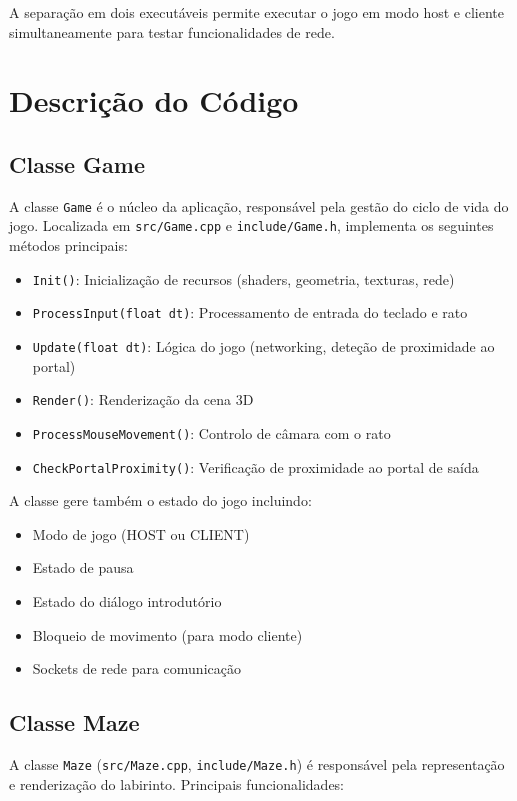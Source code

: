 A separação em dois executáveis permite executar o jogo em modo host e cliente simultaneamente para testar funcionalidades de rede.

\section{Descrição do Código} \label{sec:impl_codigo}

\subsection{Classe Game}
A classe \texttt{Game} é o núcleo da aplicação, responsável pela gestão do ciclo de vida do jogo. Localizada em \texttt{src/Game.cpp} e \texttt{include/Game.h}, implementa os seguintes métodos principais:

\begin{itemize}
    \item \texttt{Init()}: Inicialização de recursos (shaders, geometria, texturas, rede)
    \item \texttt{ProcessInput(float dt)}: Processamento de entrada do teclado e rato
    \item \texttt{Update(float dt)}: Lógica do jogo (networking, deteção de proximidade ao portal)
    \item \texttt{Render()}: Renderização da cena 3D
    \item \texttt{ProcessMouseMovement()}: Controlo de câmara com o rato
    \item \texttt{CheckPortalProximity()}: Verificação de proximidade ao portal de saída
\end{itemize}

A classe gere também o estado do jogo incluindo:
\begin{itemize}
    \item Modo de jogo (HOST ou CLIENT)
    \item Estado de pausa
    \item Estado do diálogo introdutório
    \item Bloqueio de movimento (para modo cliente)
    \item Sockets de rede para comunicação
\end{itemize}

\subsection{Classe Maze}
A classe \texttt{Maze} (\texttt{src/Maze.cpp}, \texttt{include/Maze.h}) é responsável pela representação e renderização do labirinto. Principais funcionalidades:

